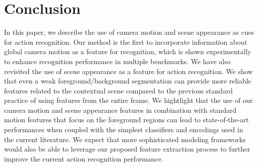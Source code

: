 \section{Conclusion}
\label{conclusion}

In this paper, we describe the use of camera motion and scene appearance as cues for action recognition.
Our method is the first to incorporate information about global camera motion as a feature for recognition,
which is shown experimentally to enhance recognition performance in multiple benchmarks. We have also
revisited the use of scene appearance as a feature for action recognition. We show that even a weak foreground/background
segmentation can provide more reliable features related to the contextual scene compared to the previous
standard practice of using features from the entire frame. We hightlight that the use of our camera motion and scene appearance
features in combination with standard motion features that focus on the foreground regions
can lead to state-of-the-art performances when coupled with the simplest classifiers
and encodings used in the current literature.
We expect that more sophisticated modeling frameworks would also be able to leverage our proposed feature extraction
process to further improve the current action recognition performance.

